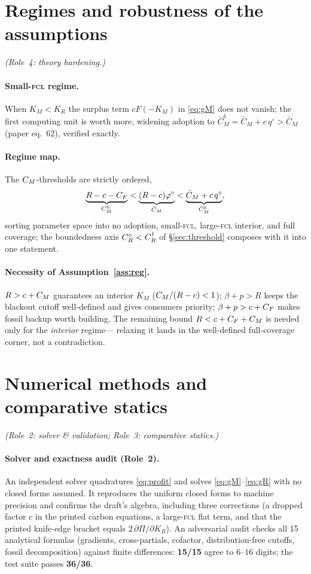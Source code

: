 \documentclass[11pt,reqno]{amsart}
\theoremstyle{plain}
\theoremstyle{definition}\newtheorem{condition}{Condition}\newtheorem{assumption}{Assumption}
\theoremstyle{remark}\newtheorem{remark}{Remark}
\newcommand{\KR}{K_R}\newcommand{\KF}{K_F}\newcommand{\KM}{K_M}
\newcommand{\CMbar}{\bar C_M}\newcommand{\bp}{\beta+p}\newcommand{\FKR}{F_{\!\KR}}
\begin{document}
\section{Regimes and robustness of the assumptions}\label{sec:regimes}
\emph{(Role~4: theory hardening.)}

\paragraph{Small-\textsc{fcl} regime.} When $\KM<\KR$ the surplus term $cF(-\KM)$
in \eqref{eq:gM} does not vanish; the first computing unit is worth more, widening
adoption to
$\CMbar^{b}=\CMbar+c\,q^{\circ}>\CMbar$ (paper eq.~62), verified exactly.

\paragraph{Regime map.} The $C_M$-thresholds are strictly ordered,
\[
  \underbrace{R-c-\CF}_{\CM^{\mathrm{fc}}}<\underbrace{(R-c)\varphi^{\circ}}_{\CMbar}<\underbrace{\CMbar+c\,q^{\circ}}_{\CMbar^{b}},
\]
sorting parameter space into no adoption, small-\textsc{fcl}, large-\textsc{fcl}
interior, and full coverage; the boundedness axis $C_R^{\circ}<C_R^{\dagger}$ of
\S\ref{sec:threshold} composes with it into one statement.

\paragraph{Necessity of Assumption~\ref{ass:reg}.} $R>c+C_M$ guarantees an
interior $\KM$ ($C_M/(R-c)<1$); $\bp>R$ keeps the blackout cutoff well-defined and
gives consumers priority; $\bp>c+\CF$ makes fossil backup worth building. The
remaining bound $R<c+C_F+C_M$ is needed only for the \emph{interior} regime---
relaxing it lands in the well-defined full-coverage corner, not a contradiction.

\section{Numerical methods and comparative statics}\label{sec:numerics}
\emph{(Role~2: solver \& validation; Role~3: comparative statics.)}

\paragraph{Solver and exactness audit (Role~2).} An independent solver quadratures
\eqref{eq:profit} and solves \eqref{eq:gM}--\eqref{eq:gR} with no closed forms
assumed. It reproduces the uniform closed forms to machine precision and confirms
the draft's algebra, including three corrections (a dropped factor $c$ in the
printed carbon equations, a large-\textsc{fcl} flat term, and that the printed
knife-edge bracket equals $2\,\partial\Pi/\partial\KR$). An adversarial audit
checks all 15 analytical formulas (gradients, cross-partials, cofactor,
distribution-free cutoffs, fossil decomposition) against finite differences:
\textbf{15/15} agree to $6$--$16$ digits; the test suite passes \textbf{36/36}.
\end{document}
